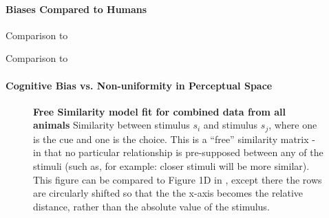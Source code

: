 

\paragraph{Biases Compared to Humans}

Comparison to \cite{bae_why_2015}

Comparison to \cite{panichello_error-correcting_2019}

\paragraph{Cognitive Bias vs. Non-uniformity in Perceptual Space}

\begin{figure}

\caption{\textbf{Free Similarity model fit for combined data from all animals}
Similarity between stimulus $s_i$ and stimulus $s_j$, where one is the cue and one is the choice. This is a ``free'' similarity matrix - in that no particular relationship is pre-supposed between any of the stimuli (such as, for example: closer stimuli will be more similar). This figure can be compared to Figure 1D in \cite{schurgin_psychophysical_2020}, except there the rows are circularly shifted so that the the x-axis becomes the relative distance, rather than the absolute value of the stimulus. %
} 
\label{fig:SimilarityMatrixCombined}
\end{figure}

